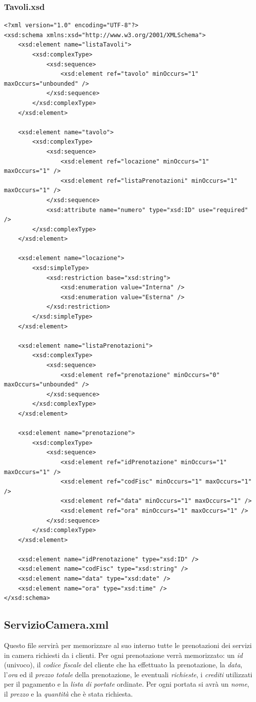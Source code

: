 \documentclass [a4paper, 12pt]{book}
\begin{document}
\subsubsection{Tavoli.xsd}
\begin{lstlisting}[style=XML]
<?xml version="1.0" encoding="UTF-8"?>
<xsd:schema xmlns:xsd="http://www.w3.org/2001/XMLSchema">
    <xsd:element name="listaTavoli">
        <xsd:complexType>
            <xsd:sequence>
                <xsd:element ref="tavolo" minOccurs="1" maxOccurs="unbounded" />
            </xsd:sequence>
        </xsd:complexType>
    </xsd:element>

    <xsd:element name="tavolo">
        <xsd:complexType>
            <xsd:sequence>
                <xsd:element ref="locazione" minOccurs="1" maxOccurs="1" />
                <xsd:element ref="listaPrenotazioni" minOccurs="1" maxOccurs="1" />
            </xsd:sequence>
            <xsd:attribute name="numero" type="xsd:ID" use="required" />
        </xsd:complexType>
    </xsd:element>

    <xsd:element name="locazione">
        <xsd:simpleType>
            <xsd:restriction base="xsd:string">
                <xsd:enumeration value="Interna" />
                <xsd:enumeration value="Esterna" />
            </xsd:restriction>
        </xsd:simpleType>
    </xsd:element>
    
    <xsd:element name="listaPrenotazioni">
        <xsd:complexType>
            <xsd:sequence>
                <xsd:element ref="prenotazione" minOccurs="0" maxOccurs="unbounded" />
            </xsd:sequence>
        </xsd:complexType>
    </xsd:element>

    <xsd:element name="prenotazione">
        <xsd:complexType>
            <xsd:sequence>
                <xsd:element ref="idPrenotazione" minOccurs="1" maxOccurs="1" />
                <xsd:element ref="codFisc" minOccurs="1" maxOccurs="1" />
                <xsd:element ref="data" minOccurs="1" maxOccurs="1" />
                <xsd:element ref="ora" minOccurs="1" maxOccurs="1" />
            </xsd:sequence>
        </xsd:complexType>
    </xsd:element>

    <xsd:element name="idPrenotazione" type="xsd:ID" />
    <xsd:element name="codFisc" type="xsd:string" />
    <xsd:element name="data" type="xsd:date" />
    <xsd:element name="ora" type="xsd:time" />
</xsd:schema>
\end{lstlisting}

\medskip

\subsection{ServizioCamera.xml}
Questo file servirà per memorizzare al suo interno tutte le prenotazioni dei servizi in camera richiesti da i clienti. Per ogni prenotazione verrà memorizzato: un \textit{id} (univoco), il \textit{codice fiscale} del cliente che ha effettuato la prenotazione, la \textit{data}, l'\textit{ora} ed il \textit{prezzo totale} della prenotazione, le eventuali \textit{richieste}, i \textit{crediti} utilizzati per il pagamento e la \textit{lista di portate} ordinate. Per ogni portata si avrà un \textit{nome}, il \textit{prezzo} e la \textit{quantità} che è stata richiesta.
\end{document}

